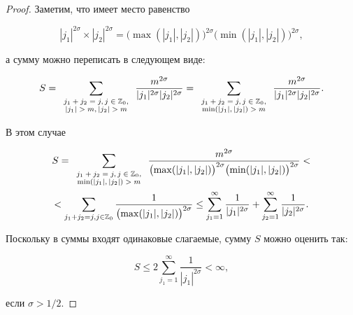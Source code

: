 \begin{proof} Заметим, что имеет место равенство

$$

|j_1|^{2\sigma}\times|j_2|^{2\sigma}=\bigl(\max(|j_1|,|j_2|)\bigr)^{2\sigma}\bigl(\min(|j_1|,|j_2|)\bigr)^{2\sigma},

$$

а сумму можно переписать в следующем виде:

$$

S=\sum_{\scriptsize

\begin{array}{c}

j_1+j_2=j,j\in \mathbb Z_0, \\ |j_1|>m, |j_2|> m

\end{array}} \frac{m^{2\sigma}}{|j_1|^{2\sigma}|j_2|^{2\sigma}}=

\sum_{

\scriptsize

\begin{array}{c}

j_1+j_2=j,j\in \mathbb Z_0, \\ \min({|j_1|,|j_2|})>m

\end{array}

} \frac{m^{2\sigma}}{|j_1|^{2\sigma}|j_2|^{2\sigma}}.

$$

В этом случае 

\begin{multline*}

S= \sum_{

\scriptsize

\begin{array}{c}

j_1+j_2=j, j\in \mathbb Z_0, \\ \min(|j_1|,|j_2|)> m

\end{array}

} \frac{m^{2\sigma}}{\bigl(\max(|j_1|,|j_2|)\bigr)^{2\sigma}\bigl(\min(|j_1|,|j_2|)\bigr)^{2\sigma}}<

\\

<\sum_{j_1+j_2=j,j\in \mathbb Z_0 } \frac{1}{\bigl(\max(|j_1|,|j_2|) \bigr)^{2\sigma}}\le \sum_{j_1=1}^\infty  \frac{1}{|j_1|^{2\sigma}}+\sum_{j_2=1}^\infty  \frac{1}{|j_2|^{2\sigma}}.

\end{multline*}

Поскольку в суммы входят одинаковые слагаемые, сумму $S$ можно оценить так:

$$

S\le 2\sum_{j_1=1}^\infty  \frac{1}{|j_1|^{2\sigma}}<\infty,

$$

если $\sigma>1/2.$

\end{proof}



